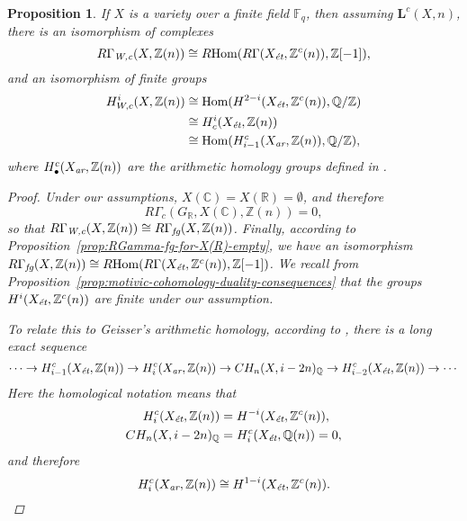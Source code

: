 \documentclass[leqno,12pt]{article}
\theoremstyle{plain}
\newtheorem{proposition}[theorem]{\indent\sc Proposition}
\theoremstyle{definition}
\DeclareMathOperator{\Hom}{Hom}
\newcommand{\CC}{\mathbb{C}}
\newcommand{\FF}{\mathbb{F}}
\newcommand{\QQ}{\mathbb{Q}}
\newcommand{\RR}{\mathbb{R}}
\newcommand{\ZZ}{\mathbb{Z}}
\newcommand{\Wc}{\text{\it W,c}}
\newcommand{\ar}{\text{\it ar}}
\newcommand{\et}{\text{\it \'{e}t}}
\newcommand{\fg}{\text{\it fg}}
\newcommand{\RHom}{R\!\Hom}
\begin{document}
\begin{proposition}
  If $X$ is a variety over a finite field $\FF_q$, then assuming
  $\mathbf{L}^c (X,n)$, there is an isomorphism of complexes
  \begin{equation}
    \label{eqn:RGamma-Wc-over-finite-fields}
    R\Gamma_\Wc (X,\ZZ(n)) \cong \RHom (R\Gamma (X_\et, \ZZ^c (n)), \ZZ [-1]),
  \end{equation}
  and an isomorphism of finite groups
  \begin{align*}
    H^i_{W,c} (X, \ZZ (n)) & \cong
                             \Hom (H^{2-i} (X_\et, \ZZ^c (n)), \QQ/\ZZ)\\
                           & \cong
                             H^i_c (X_\et, \ZZ(n)) \\
                           & \cong
                             \Hom (H_{i-1}^c (X_\ar, \ZZ (n)), \QQ/\ZZ),
  \end{align*}
  where $H_\bullet^c (X_\ar, \ZZ (n))$ are the arithmetic homology groups
  defined in {\rm \cite[\S 3]{Geisser-2010-arithmetic-homology}}.

  \begin{proof}
    Under our assumptions, $X (\CC) = X (\RR) = \emptyset$, and therefore
    \[ R\Gamma_c (G_\RR, X (\CC), \ZZ (n)) = 0, \] so that
    $R\Gamma_\Wc (X,\ZZ(n)) \cong R\Gamma_\fg (X, \ZZ (n))$. Finally, according
    to Proposition~\ref{prop:RGamma-fg-for-X(R)-empty}, we have an isomorphism
    $R\Gamma_\fg (X, \ZZ (n)) \cong \RHom (R\Gamma (X_\et, \ZZ^c (n)), \ZZ
    [-1])$.  We recall from
    Proposition~\ref{prop:motivic-cohomology-duality-consequences} that the
    groups $H^i (X_\et, \ZZ^c(n))$ are finite under our assumption.

    To relate this to Geisser's arithmetic homology, according to
    \cite[Theorem~3.1]{Geisser-2010-arithmetic-homology}, there is a long exact
    sequence
    \[ \cdots \to H_{i-1}^c (X_\et, \ZZ (n)) \to
      H_i^c (X_\ar, \ZZ (n)) \to CH_n (X, i-2n)_\QQ \to
      H_{i-2}^c (X_\et, \ZZ (n)) \to \cdots \]
    Here the homological notation means that
    \begin{align*}
      H_i^c (X_\et, \ZZ (n)) & = H^{-i} (X_\et, \ZZ^c (n)), \\
      CH_n (X, i-2n)_\QQ & = H_i^c (X_\et, \QQ (n)) = 0,
    \end{align*}
    and therefore
    $$H_i^c (X_\ar, \ZZ (n)) \cong H^{1-i} (X_\et, \ZZ^c (n)).$$


\end{proof}
\end{proposition}
\end{document}
